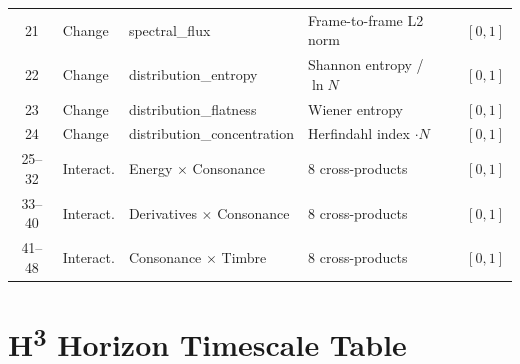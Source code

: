 \documentclass[10pt,twocolumn]{article}
\newcommand{\Htri}{H\textsuperscript{3}}
\begin{document}
\begin{table}[H]
\begin{tabular}{@{}clllc@{}}
\midrule
21 & Change & spectral\_flux & Frame-to-frame L2 norm & $[0,1]$ \\
22 & Change & distribution\_entropy & Shannon entropy / $\ln N$ & $[0,1]$ \\
23 & Change & distribution\_flatness & Wiener entropy & $[0,1]$ \\
24 & Change & distribution\_concentration & Herfindahl index $\cdot N$ & $[0,1]$ \\
\midrule
25--32 & Interact. & Energy $\times$ Consonance & 8 cross-products & $[0,1]$ \\
33--40 & Interact. & Derivatives $\times$ Consonance & 8 cross-products & $[0,1]$ \\
41--48 & Interact. & Consonance $\times$ Timbre & 8 cross-products & $[0,1]$ \\
\bottomrule
\end{tabular}
\end{table}


\section{\Htri{} Horizon Timescale Table}
\label{app:horizons}
\end{document}
